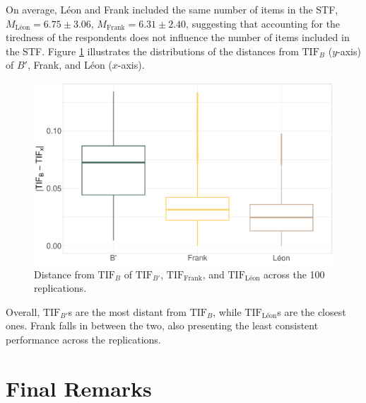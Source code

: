 \documentclass{svproc}
\begin{document}
On average, Léon and Frank included the same number of items in the STF, $M_{\text{Léon}} = 6.75 \pm 3.06$, $M_{\text{Frank}} = 6.31 \pm 2.40$, suggesting that accounting for the tiredness of the respondents does not influence the number of items included in the STF.
Figure \ref{fig:points-alogirthms} illustrates the distributions of the distances from $\text{TIF}_B$ ($y$-axis) of $B'$, Frank, and Léon ($x$-axis).

\begin{figure}[!h]
	\centering
	\includegraphics[width=\linewidth]{img/box-plot-alogirthms}
	\caption{Distance from $\text{TIF}_{B}$ of $\text{TIF}_{B'}$, $\text{TIF}_{\text{Frank}}$, and $\text{TIF}_{\text{Léon}}$  across the 100 replications.} 
	\label{fig:points-alogirthms}
\end{figure}

Overall, $\text{TIF}_{B'}$s are the most distant from $\text{TIF}_B$, while $\text{TIF}_{\text{Léon}}$s are the closest ones. Frank falls in between the two, also presenting the least consistent performance across the replications. 

\section{Final Remarks}
\end{document}
